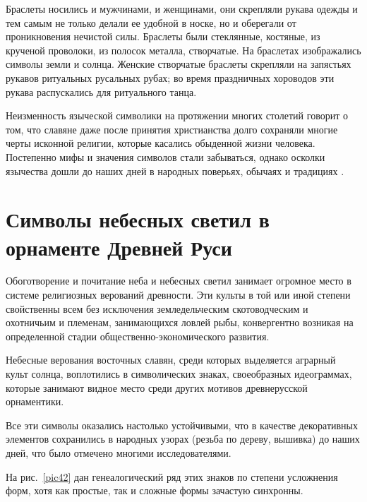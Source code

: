 \documentclass[pscyr,titlepage,chapters]{hedreport}
\begin{document}
  Браслеты носились и мужчинами, и женщинами, они скрепляли рукава одежды и тем
  самым не только делали ее удобной в носке, но и оберегали от проникновения
  нечистой силы. Браслеты были стеклянные, костяные, из крученой проволоки, из
  полосок металла, створчатые. На браслетах изображались символы земли и солнца.
  Женские створчатые браслеты скрепляли на запястьях рукавов ритуальных
  русальных рубах; во время праздничных хороводов эти рукава распускались для
  ритуального танца.

  Неизменность языческой символики на протяжении многих столетий говорит о том,
  что славяне даже после принятия христианства долго сохраняли многие черты
  исконной религии, которые касались обыденной жизни человека. Постепенно мифы и
  значения символов стали забываться, однако осколки язычества дошли до наших
  дней в народных поверьях, обычаях и традициях \cite{3}.

  \chapter{Символы небесных светил в орнаменте Древней Руси}
 
  Обоготворение и почитание неба и небесных светил занимает огромное место в
  системе религиозных верований древности. Эти культы в той или иной степени
  свойственны всем без исключения земледельческим скотоводческим и охотничьим и
  племенам, занимающихся ловлей рыбы, конвергентно возникая на определенной
  стадии общественно-экономического развития.

  Небесные верования восточных славян, среди которых выделяется аграрный культ
  солнца, воплотились в символических знаках, своеобразных идеограммах, которые
  занимают видное место среди других мотивов древнерусской орнаментики.

  Все эти символы оказались настолько устойчивыми, что в качестве декоративных
  элементов сохранились в народных узорах (резьба по дереву, вышивка) до наших
  дней, что было отмечено многими исследователями.

  На рис.~\ref{pic42} дан генеалогический ряд этих знаков по степени усложнения
  форм, хотя как простые, так и сложные формы зачастую синхронны.
 
\end{document}
